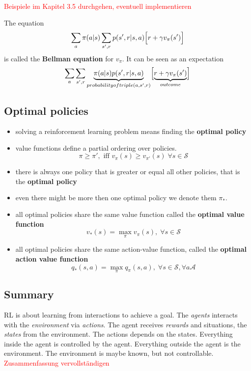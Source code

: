\documentclass[10pt,a4paper]{article}
\begin{document}
\textcolor{red}{Beispiele im Kapitel 3.5 durchgehen, eventuell implementieren}

The equation
\[ \sum_a \pi(a|s) \sum_{s',r} p(s',r | s,a) \Bigl[r + \gamma v_\pi(s') \Bigr ]\]
is called the \textbf{Bellman equation} for $v_\pi$. It can be seen as an expectation
\[\sum_a \sum_{s',r} \underbrace{\pi(a|s)p(s',r | s,a)}_{probability of triple(a,s',r)} 
\Bigl[\underbrace{r + \gamma v_\pi(s')}_{outcome} \Bigr ] \]

\subsection{Optimal policies}
\begin{itemize}
\item solving a reinforcement learning problem means finding the \textbf{optimal policy}
\item value functions define a partial ordering over policies. 
\[ \pi \ge \pi', \text{ iff } v_\pi(s) \ge v_{\pi'}(s)\; \forall s \in \mathcal{S}\]
\item there is always one policy that is greater or equal all other policies, that is the \textbf{optimal policy}
\item even there might be more then one optimal policy we denote them $\pi_*$.
\item all optimal policies share the same value function called the \textbf{optimal value function}
\[ v_*(s) = \max_\pi v_\pi(s), \; \forall s \in \mathcal{S}\]
\item all optimal policies share the same action-value function, called the \textbf{optimal action value function}
\[ q_*(s,a) = \max_\pi q_\pi(s,a), \; \forall s \in \mathcal{S}, \forall a  \mathcal{A}\]
\end{itemize}

\subsection{Summary}
RL is about learning from interactions to achieve a goal. The \textit{agents} interacts with the \textit{environment} via \textit{actions}. The agent receives \textit{rewards} and situations, the \textit{states} from the environment. The actions depends on the states. Everything inside the agent is controlled by the agent. Everything outside the agent is the environment. The environment is maybe known, but not controllable.
\textcolor{red}{Zusammenfassung vervollständigen}
\end{document}
